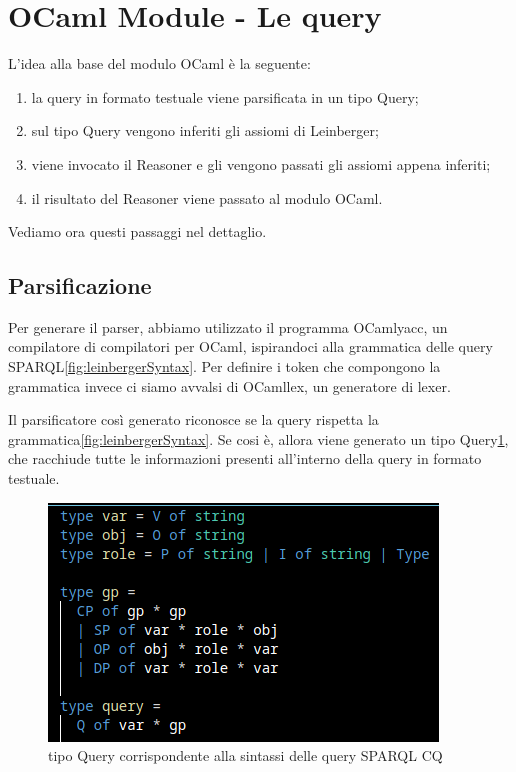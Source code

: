 \newpage
\section{OCaml Module - Le query} \label{sec:OCaml Module - Le query}
L'idea alla base del modulo OCaml è la seguente:
\begin{enumerate}
    \item la query in formato testuale viene parsificata in un tipo Query;
    \item sul tipo Query vengono inferiti gli assiomi di Leinberger;
    \item viene invocato il Reasoner e gli vengono passati gli assiomi appena inferiti;
    \item il risultato del Reasoner viene passato al modulo OCaml.
\end{enumerate}
Vediamo ora questi passaggi nel dettaglio.

\subsection{Parsificazione}
Per generare il parser, abbiamo utilizzato il programma OCamlyacc, un compilatore di compilatori per OCaml, ispirandoci alla grammatica delle query SPARQL\ref{fig:leinbergerSyntax}.
Per definire i token che compongono la grammatica invece ci siamo avvalsi di OCamllex, un generatore di lexer.

Il parsificatore così generato riconosce se la query rispetta la grammatica\ref{fig:leinbergerSyntax}. Se cosi è, allora viene generato un tipo Query\ref{fig:querType}, che racchiude tutte le informazioni presenti all'interno della query in formato testuale.

\begin{figure}[H]
    \centering
    \includegraphics[scale=0.7]{pictures/queryType.png}
    \caption{tipo Query corrispondente alla sintassi delle query SPARQL CQ}
    \label{fig:querType}
\end{figure}


